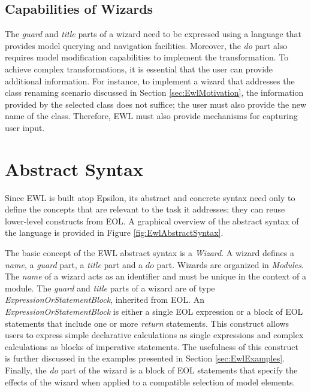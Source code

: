 \subsection{Capabilities of Wizards}

The \emph{guard} and \emph{title} parts of a wizard need to be expressed using a language that provides model querying and navigation facilities. Moreover, the \emph{do} part also requires model modification capabilities to implement the transformation. To achieve complex transformations, it is essential that the user can provide additional information. For instance, to implement a wizard that addresses the class renaming scenario discussed in Section \ref{sec:EwlMotivation}, the information provided by the selected class does not suffice; the user must also provide the new name of the class. Therefore, EWL must also provide mechanisms for capturing user input.

\section{Abstract Syntax}

Since EWL is built atop Epsilon, its abstract and concrete syntax need only to define the concepts that are relevant to the task it addresses; they can reuse lower-level constructs from EOL. A graphical overview of the abstract syntax of the language is provided in Figure \ref{fig:EwlAbstractSyntax}. 

The basic concept of the EWL abstract syntax is a \emph{Wizard}. A wizard defines a \emph{name}, a \emph{guard} part, a \emph{title} part and a $do$ part. Wizards are organized in \emph{Modules}. The \emph{name} of a wizard acts as an identifier and must be unique in the context of a module. The \emph{guard} and \emph{title} parts of a wizard are of type \emph{ExpressionOrStatementBlock}, inherited from EOL. An \emph{ExpressionOrStatementBlock} is either a single EOL expression or a block of EOL statements that include one or more \emph{return} statements. This construct allows users to express simple declarative calculations as single expressions and complex calculations as blocks of imperative statements. The usefulness of this construct is further discussed in the examples presented in Section \ref{sec:EwlExamples}. Finally, the \emph{do} part of the wizard is a block of EOL statements that specify the effects of the wizard when applied to a compatible selection of model elements. 

